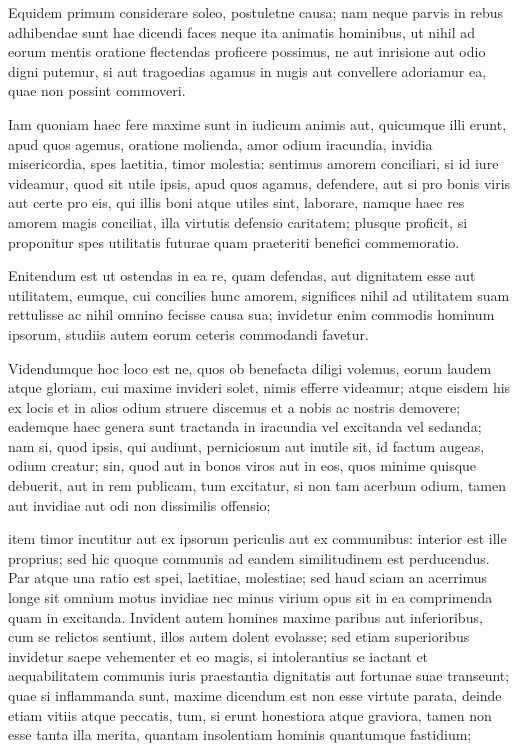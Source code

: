  Equidem primum considerare soleo, postuletne causa; nam neque parvis in rebus adhibendae sunt hae dicendi faces neque ita animatis hominibus, ut nihil ad eorum mentis oratione flectendas proficere possimus, ne aut inrisione aut odio digni putemur, si aut tragoedias agamus in nugis aut convellere adoriamur ea, quae non possint commoveri.

 Iam quoniam haec fere maxime sunt in iudicum animis aut, quicumque illi erunt, apud quos agemus, oratione molienda, amor odium iracundia, invidia misericordia, spes laetitia, timor molestia: sentimus amorem conciliari, si id iure videamur, quod sit utile ipsis, apud quos agamus, defendere, aut si pro bonis viris aut certe pro eis, qui illis boni atque utiles sint, laborare, namque haec res amorem magis conciliat, illa virtutis defensio caritatem; plusque proficit, si proponitur spes utilitatis futurae quam praeteriti benefici commemoratio.

 Enitendum est ut ostendas in ea re, quam defendas, aut dignitatem esse aut utilitatem, eumque, cui concilies hunc amorem, significes nihil ad utilitatem suam rettulisse ac nihil omnino fecisse causa sua; invidetur enim commodis hominum ipsorum, studiis autem eorum ceteris commodandi favetur.

 Videndumque hoc loco est ne, quos ob benefacta diligi volemus, eorum laudem atque gloriam, cui maxime invideri solet, nimis efferre videamur; atque eisdem his ex locis et in alios odium struere discemus et a nobis ac nostris demovere; eademque haec genera sunt tractanda in iracundia vel excitanda vel sedanda; nam si, quod ipsis, qui audiunt, perniciosum aut inutile sit, id factum augeas, odium creatur; sin, quod aut in bonos viros aut in eos, quos minime quisque debuerit, aut in rem publicam, tum excitatur, si non tam acerbum odium, tamen aut invidiae aut odi non dissimilis offensio;

 item timor incutitur aut ex ipsorum periculis aut ex communibus: interior est ille proprius; sed hic quoque communis ad eandem similitudinem est perducendus. Par atque una ratio est spei, laetitiae, molestiae; sed haud sciam an acerrimus longe sit omnium motus invidiae nec minus virium opus sit in ea comprimenda quam in excitanda. Invident autem homines maxime paribus aut inferioribus, cum se relictos sentiunt, illos autem dolent evolasse; sed etiam superioribus invidetur saepe vehementer et eo magis, si intolerantius se iactant et aequabilitatem communis iuris praestantia dignitatis aut fortunae suae transeunt; quae si inflammanda sunt, maxime dicendum est non esse virtute parata, deinde etiam vitiis atque peccatis, tum, si erunt honestiora atque graviora, tamen non esse tanta illa merita, quantam insolentiam hominis quantumque fastidium;

